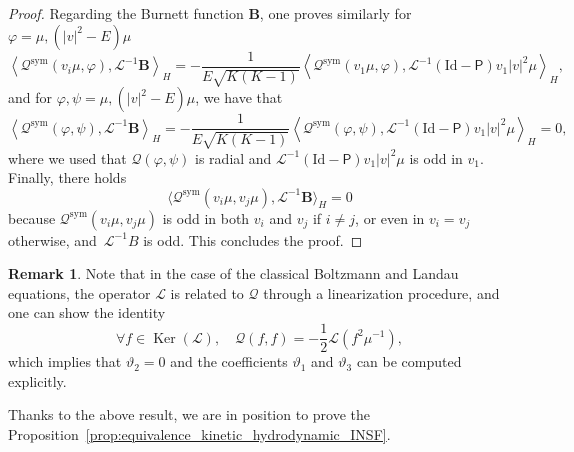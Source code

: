 \documentclass[10pt]{amsart}
\theoremstyle{definition}\newtheorem{defi}[theo]{Definition}\newtheorem{rema}[theo]{Remark}\newtheorem{exam}[theo]{Example}\newtheorem{exem}[theo]{Example}\newtheorem{nota}[theo]{Notation}
\DeclareMathOperator{\nul}{Ker}
\newcommand{\sym}{\mathrm{sym}}
\newcommand{\Id}{\mathrm{Id}}
\newcommand{\BurB}{{\mathbf{B}}}
\newcommand{\LL}{\mathcal{L}}
\newcommand{\PP}{\mathsf{P}}
\newcommand{\QQ}{\mathcal{Q}}
\newcommand{\Ss}{H}
\newcommand{\la}{\langle}
\newcommand{\ra}{\rangle}
\let\oldforall\forall
\renewcommand*{\forall}{\mathrel{\oldforall}}
\begin{document}
\begin{proof}
Regarding the Burnett function $\BurB $, one proves similarly for $\varphi = \mu, (|v|^2 - E) \mu$
\[
\left\la \QQ^\sym(v_i \mu, \varphi), \LL^{-1}\BurB \right\ra_{\Ss} = - \dfrac{1}{E \sqrt{K (K-1)}} \left\la \QQ^\sym(v_1 \mu, \varphi), \LL^{-1} \left(\Id - \PP \right) v_1 |v|^2 \mu \right\ra_{\Ss},
\]
and for $\varphi, \psi = \mu, (|v|^2 - E) \mu$, we have that
\[
\left\la \QQ^\sym(\varphi, \psi), \LL^{-1}\BurB \right\ra_{\Ss} = - \dfrac{1}{E \sqrt{K (K-1)}} \left\la \QQ^\sym(\varphi, \psi), \LL^{-1} \left(\Id - \PP \right) v_1 |v|^2 \mu \right\ra_{\Ss} = 0,
\]
where we used that $\QQ(\varphi, \psi)$ is radial and $\LL^{-1}(\Id - \PP) v_1 |v|^2 \mu$ is odd in $v_1$. Finally, there holds
\[
\la \QQ^\sym(v_i \mu, v_j \mu), \LL^{-1}\BurB \ra_\Ss = 0
\]
because $\QQ^\sym(v_i \mu, v_j \mu)$ is odd in both $v_i$ and $v_j$ if $i \neq j$, or even in $v_i = v_j$ otherwise, and~$\LL^{-1} B$ is odd. This concludes the proof.
\end{proof}

\begin{rema}
Note that in the case of the classical Boltzmann and Landau equations, the operator $\LL$ is related to $\QQ$ through a linearization procedure, and one can show the identity
\[
\forall f \in \nul(\LL), \quad \QQ(f, f) = - \frac{1}{2} \LL \left(f^2 \mu^{-1} \right),
\]
which implies that $\vartheta_2 = 0$ and the coefficients $\vartheta_1$ and $\vartheta_3$ can be computed explicitly.
\end{rema}


Thanks to the above result, we are in position to prove the Proposition~\ref{prop:equivalence_kinetic_hydrodynamic_INSF}.
\end{document}
